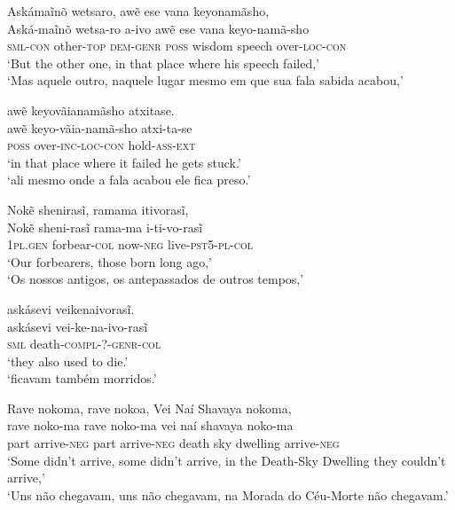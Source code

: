 \documentclass[output=paper,
modfonts,nonflat
]{langsci/langscibook}
\begin{document}

\ea Askámaĩnõ wetsaro, awẽ ese vana keyonamãsho, \\[.3em]
\gll Aská-maĩnõ       wetsa-ro          a-ivo    awẽ   ese    vana   keyo-namã-sho         \\
     \textsc{sml-con} other-\textsc{top} \textsc{dem-genr} \textsc{poss} wisdom speech over-\textsc{loc-con} \\
\glt `But the other one, in that place where his speech failed,' \\
`Mas aquele outro, naquele lugar mesmo em que sua fala sabida acabou,' \\
\z

\ea awẽ keyovãianamãsho atxitase. \\[.3em]
\gll awẽ           keyo-vãia-namã-sho        atxi-ta-se            \\
     \textsc{poss} over-\textsc{inc-loc-con} hold-\textsc{ass-ext} \\
\glt `in that place where it failed he gets stuck.' \\
`ali mesmo onde a fala acabou ele fica preso.' \\
\z

\ea Nokẽ shenirasĩ, ramama itivorasĩ, \\[.3em]
\gll Nokẽ             sheni-rasĩ           rama-ma          i-ti-vo-rasĩ              \\
     1\textsc{pl.gen} forbear-\textsc{col} now-\textsc{neg} live-\textsc{pst5-pl-col} \\
\glt `Our forbearers, those born long ago,' \\
`Os nossos antigos, os antepassados de outros tempos,' \\
\z

\ea askásevi veikenaivorasĩ. \\[.3em]
\gll askásevi     vei-ke-na-ivo-rasĩ              \\
     \textsc{sml} death-\textsc{compl-?-genr-col} \\
\glt `they also used to die.' \footnotemark \\
 `ficavam também morridos.'\\
\z


\ea Rave nokoma, rave nokoa, Vei Naí Shavaya nokoma, \\[.3em]
\gll rave noko-ma             rave noko-ma             vei   naí shavaya  noko-ma             \\
     part arrive-\textsc{neg} part arrive-\textsc{neg} death sky dwelling arrive-\textsc{neg} \\
\glt `Some didn't arrive, some didn't arrive, in the Death-Sky Dwelling they couldn't arrive,' \\
`Uns não chegavam, uns não chegavam, na Morada do Céu-Morte não chegavam.'\\
\z
\end{document}
